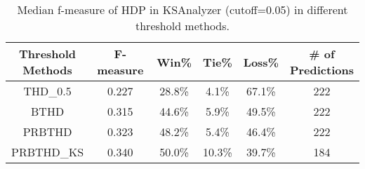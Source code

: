 \begin{table}[t]
\scriptsize
\centering
\caption{Median f-measure of HDP in KSAnalyzer (cutoff=0.05) in different threshold methods.
}
\label{tab:threshold_result}
\begin{tabular}{|c||c||c|c|c||c|}
\hline

\specialcell{{\bf Threshold}\\{\bf Methods}}
& {\bf F-measure}
& {\bf Win}\%
& {\bf Tie}\% 
& {\bf Loss}\%
& \specialcell{{\bf \# of}\\{\bf Predictions}} \\ \hline \hline
THD\_0.5 & 0.227	& 28.8\% & 4.1\%	& 67.1\% & 222\\ \hline
BTHD & 0.315	& 44.6\% & 5.9\%	& 49.5\% & 222\\ \hline
PRBTHD & 0.323	& 48.2\% & 5.4\%	& 46.4\% & 222\\ \hline
PRBTHD\_KS& 0.340	& 50.0\% & 10.3\%	& 39.7\% & 184\\ \hline



\end{tabular}
\end{table}


